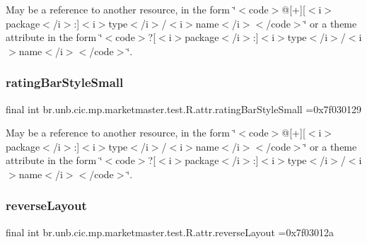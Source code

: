 May be a reference to another resource, in the form \char`\"{}$<$code$>$@\mbox{[}+\mbox{]}\mbox{[}$<$i$>$package$<$/i$>$\+:\mbox{]}$<$i$>$type$<$/i$>$/$<$i$>$name$<$/i$>$$<$/code$>$\char`\"{} or a theme attribute in the form \char`\"{}$<$code$>$?\mbox{[}$<$i$>$package$<$/i$>$\+:\mbox{]}$<$i$>$type$<$/i$>$/$<$i$>$name$<$/i$>$$<$/code$>$\char`\"{}. \mbox{\label{classbr_1_1unb_1_1cic_1_1mp_1_1marketmaster_1_1test_1_1R_1_1attr_ac61da0e9c8906967dbdbbd1163ef0f5e}} 
\subsubsection{\texorpdfstring{rating\+Bar\+Style\+Small}{ratingBarStyleSmall}}
{\footnotesize\ttfamily final int br.\+unb.\+cic.\+mp.\+marketmaster.\+test.\+R.\+attr.\+rating\+Bar\+Style\+Small =0x7f030129\hspace{0.3cm}{\ttfamily [static]}}

May be a reference to another resource, in the form \char`\"{}$<$code$>$@\mbox{[}+\mbox{]}\mbox{[}$<$i$>$package$<$/i$>$\+:\mbox{]}$<$i$>$type$<$/i$>$/$<$i$>$name$<$/i$>$$<$/code$>$\char`\"{} or a theme attribute in the form \char`\"{}$<$code$>$?\mbox{[}$<$i$>$package$<$/i$>$\+:\mbox{]}$<$i$>$type$<$/i$>$/$<$i$>$name$<$/i$>$$<$/code$>$\char`\"{}. \mbox{\label{classbr_1_1unb_1_1cic_1_1mp_1_1marketmaster_1_1test_1_1R_1_1attr_ae33b2e842b00c21e6ca23fc760048691}} 
\subsubsection{\texorpdfstring{reverse\+Layout}{reverseLayout}}
{\footnotesize\ttfamily final int br.\+unb.\+cic.\+mp.\+marketmaster.\+test.\+R.\+attr.\+reverse\+Layout =0x7f03012a\hspace{0.3cm}{\ttfamily [static]}}

